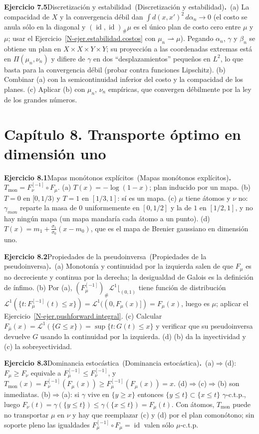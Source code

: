 \documentclass[11pt,a4paper]{amsart}
\newcommand{\id}{\operatorname{id}}
\newcommand{\LL}{{\mathcal L}}
\theoremstyle{remark}
\theoremstyle{definition}
\numberwithin{subsection}{section}
\numberwithin{equation}{section}
\newcommand{\ejlabel}[2]{\par\medskip\noindent\textbf{Ejercicio #1}\ifx\relax#2\relax\else\ (#2)\fi\textbf{.}\ }
\begin{document}
\ejlabel{7.5}{Discretización y estabilidad}(a) La compacidad de $X$ y la convergencia débil dan $\int d(x,x')^2\,d\alpha_n\to0$ (el costo se anula sólo en la diagonal y $(\id,\id)_\#\mu$ es el único plan de costo cero entre $\mu$ y $\mu$; usar el Ejercicio~\ref{N-ejer.estabilidad.costos} con $\mu_n\rightharpoonup\mu$). Pegando $\alpha_n$, $\gamma$ y $\beta_n$ se obtiene un plan en $X\times X\times Y\times Y$; su proyección a las coordenadas extremas está en $\Pi(\mu_n,\nu_n)$ y difiere de $\gamma$ en dos ``desplazamientos'' pequeños en $L^2$, lo que basta para la convergencia débil (probar contra funciones Lipschitz). (b) Combinar (a) con la semicontinuidad inferior del costo y la compacidad de los planes. (c) Aplicar (b) con $\mu_n$, $\nu_n$ empíricas, que convergen débilmente por la ley de los grandes números.

\section*{Capítulo 8. Transporte óptimo en dimensión uno}
\ejlabel{8.1}{Mapas monótonos explícitos}$T_\text{mon}=F_\nu^{[-1]}\circ F_\mu$. (a) $T(x)=-\log(1-x)$; plan inducido por un mapa. (b) $T=0$ en $[0,1/3)$ y $T=1$ en $[1/3,1]$: sí es un mapa. (c) $\mu$ tiene átomos y $\nu$ no: $\gamma_{mon}$ reparte la masa de $0$ uniformemente en $[0,1/2]$ y la de $1$ en $[1/2,1]$, y no hay ningún mapa (un mapa mandaría cada átomo a un punto). (d) $T(x)=m_1+\frac{\sigma_1}{\sigma_0}(x-m_0)$, que es el mapa de Brenier gaussiano en dimensión uno.

\ejlabel{8.2}{Propiedades de la pseudoinversa}(a) Monotonía y continuidad por la izquierda salen de que $F_\mu$ es no decreciente y continua por la derecha; la desigualdad de Galois es la definición de ínfimo. (b) Por (a), $(F_\mu^{[-1]})_\#\LL^1\lfloor_{(0,1)}$ tiene función de distribución $\LL^1(\{t:F_\mu^{[-1]}(t)\le x\})=\LL^1((0,F_\mu(x)])=F_\mu(x)$, luego es $\mu$; aplicar el Ejercicio~\ref{N-ejer.pushforward.integral}. (c) Calcular $F_{\bar\mu}(x)=\LL^1(\{G\le x\})=\sup\{t:G(t)\le x\}$ y verificar que su pseudoinversa devuelve $G$ usando la continuidad por la izquierda. (d) (b) da la inyectividad y (c) la sobreyectividad.

\ejlabel{8.3}{Dominancia estocástica}(a)$\Rightarrow$(d): $F_\mu\ge F_\nu$ equivale a $F_\mu^{[-1]}\le F_\nu^{[-1]}$, y $T_\text{mon}(x)=F_\nu^{[-1]}(F_\mu(x))\ge F_\mu^{[-1]}(F_\mu(x))=x$. (d)$\Rightarrow$(c)$\Rightarrow$(b) son inmediatas. (b)$\Rightarrow$(a): si $\gamma$ vive en $\{y\ge x\}$ entonces $\{y\le t\}\subset\{x\le t\}$ $\gamma$-c.t.p., luego $F_\nu(t)=\gamma(\{y\le t\})\le\gamma(\{x\le t\})=F_\mu(t)$. Con átomos, $T_\text{mon}$ puede no transportar $\mu$ en $\nu$ y hay que reemplazar (c) y (d) por el plan comonótono; sin soporte pleno las igualdades $F_\mu^{[-1]}\circ F_\mu=\id$ valen sólo $\mu$-c.t.p.
\end{document}
